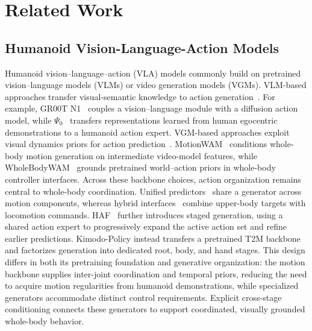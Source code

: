 \section{Related Work}
\label{sec:related_work}


% 

\subsection{Humanoid Vision-Language-Action Models}
Humanoid vision--language--action (VLA) models commonly build on pretrained vision--language models (VLMs) or video generation models (VGMs). VLM-based approaches transfer visual-semantic knowledge to action generation~\cite{grootn1,psi0,humanoidexo,openhlm}. For example, GR00T N1~\cite{grootn1} couples a vision--language module with a diffusion action model, while $\Psi_0$~\cite{psi0} transfers representations learned from human egocentric demonstrations to a humanoid action expert. VGM-based approaches exploit visual dynamics priors for action prediction~\cite{motionwam,wholebodywam_wbc}. MotionWAM~\cite{motionwam} conditions whole-body motion generation on intermediate video-model features, while WholeBodyWAM~\cite{wholebodywam_wbc} grounds pretrained world--action priors in whole-body controller interfaces. Across these backbone choices, action organization remains central to whole-body coordination. Unified predictors~\cite{openhlm,motionwam} share a generator across motion components, whereas hybrid interfaces~\cite{humanoidexo,wholebodyvla} combine upper-body targets with locomotion commands. HAF~\cite{haf} further introduces staged generation, using a shared action expert to progressively expand the active action set and refine earlier predictions. Kimodo-Policy instead transfers a pretrained T2M backbone and factorizes generation into dedicated root, body, and hand stages. This design differs in both its pretraining foundation and generative organization: the motion backbone supplies inter-joint coordination and temporal priors, reducing the need to acquire motion regularities from humanoid demonstrations, while specialized generators accommodate distinct control requirements. Explicit cross-stage conditioning connects these generators to support coordinated, visually grounded whole-body behavior.

% 

